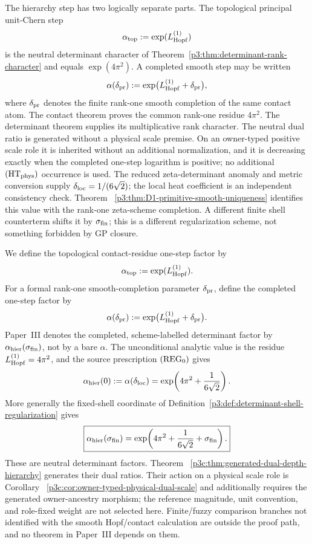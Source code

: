 \documentclass[12pt,a4paper]{article}
\begin{document}
The hierarchy step has two logically separate parts.  The topological principal unit-Chern step
\[
\alpha_{\rm top}:=\exp(L_{\mathrm{Hopf}}^{(1)})
\]
is the neutral determinant character of
Theorem~\ref{p3:thm:determinant-rank-character} and equals
\(\exp(4\pi^2)\).  A completed smooth step may be written
\[
\alpha(\delta_{\rm pr}):=\exp\!\big(L_{\mathrm{Hopf}}^{(1)}+\delta_{\rm pr}\big),
\]
where \(\delta_{\rm pr}\) denotes the finite rank-one smooth completion of the same contact
atom.  The contact theorem proves the common rank-one residue \(4\pi^2\).
The determinant theorem supplies its multiplicative rank character.  The
neutral dual ratio is generated without a physical scale premise.  On an
owner-typed positive scale role it is inherited without an additional
normalization, and it is decreasing exactly when the completed one-step
logarithm is positive; no additional \((\mathrm{HT}_{\rm phys})\) occurrence
is used.  The reduced zeta-determinant anomaly and metric conversion supply
\(\delta_{\rm loc}=1/(6\sqrt2)\); the local heat coefficient is an independent
consistency check.  Theorem~
\ref{p3:thm:D1-primitive-smooth-uniqueness} identifies this value with the
rank-one zeta-scheme completion.  A different finite shell counterterm shifts
it by \(\sigma_{\rm fin}\); this is a different regularization scheme, not
something forbidden by GP closure.


\begin{definition}\label{p3:def:alpha-two}
We define the topological contact-residue one-step factor by
\[
\alpha_{\rm top}:=\exp(L_{\mathrm{Hopf}}^{(1)}).
\]
For a formal rank-one smooth-completion parameter \(\delta_{\rm pr}\), define the completed one-step
factor by
\[
\alpha(\delta_{\rm pr}) := \exp\!\big(L_{\mathrm{Hopf}}^{(1)}+\delta_{\rm pr}\big).
\]
Paper~III denotes the completed, scheme-labelled determinant factor by
\(\alpha_{\rm hier}(\sigma_{\rm fin})\), not by a bare \(\alpha\).  The
unconditional analytic value is the residue \(L_{\mathrm{Hopf}}^{(1)}=4\pi^2\), and the
source prescription \(({\rm REG}_0)\) gives
\[
\alpha_{\rm hier}(0):=\alpha(\delta_{\rm loc})=
\exp\!\left(4\pi^2+\frac{1}{6\sqrt2}\right).
\]
More generally the fixed-shell coordinate of
Definition~\ref{p3:def:determinant-shell-regularization} gives
\[
 \boxed{\alpha_{\rm hier}(\sigma_{\rm fin})
 =\exp\!\left(4\pi^2+\frac{1}{6\sqrt2}+\sigma_{\rm fin}\right).}
\]
These are neutral determinant factors.  Theorem~
\ref{p3c:thm:generated-dual-depth-hierarchy} generates their dual ratios.
Their action on a physical scale role is Corollary~
\ref{p3c:cor:owner-typed-physical-dual-scale} and additionally requires the
generated owner-ancestry morphism; the reference magnitude, unit convention,
and role-fixed weight are not selected here.
Finite/fuzzy comparison branches not identified with the smooth Hopf/contact calculation are outside the proof path, and no theorem in
Paper~III depends on them.
\end{definition}
\end{document}
